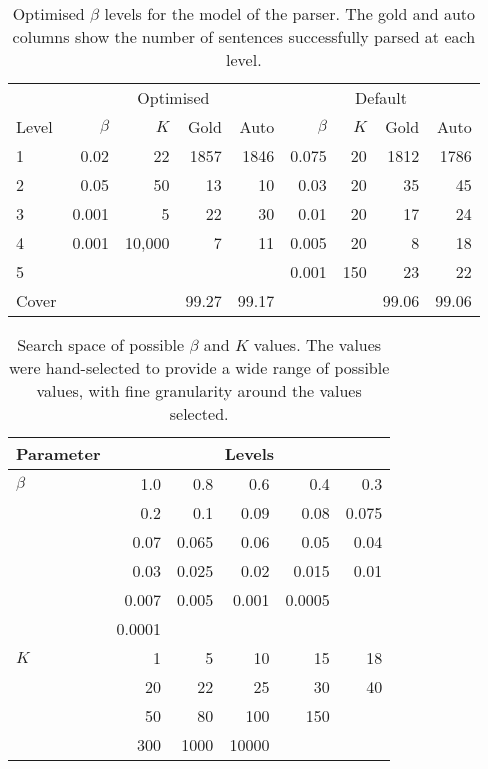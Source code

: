\begin{table}
\centering
\begin{tabular}{l|rrrr|rrrr}
\hline
      & \multicolumn{4}{c|}{Optimised}& \multicolumn{4}{c}{Default} \\
Level & $\beta$ & $K$ & Gold & Auto   & $\beta$ & $K$  & Gold & Auto \\
\hline
\hline
1     & 0.02    & 22      & 1857 & 1846   & 0.075    & 20  & 1812 & 1786 \\
2     & 0.05    & 50      & 13   & 10     & 0.03     & 20  & 35   & 45   \\
3     & 0.001   & 5       & 22   & 30     & 0.01     & 20  & 17    & 24   \\
4     & 0.001   & 10,000  & 7    & 11     & 0.005    & 20  & 8    & 18    \\
5     &         &         &      &        & 0.001    & 150 & 23   & 22   \\
\hline
Cover &         &         &99.27 & 99.17  &          &     &99.06 & 99.06\\
\hline
\end{tabular}
 \caption[Optimised $\beta$ levels for \ccgbank parser.]{Optimised $\beta$
levels for the \hybrid model of the \ccgbank parser. The gold and auto columns
show the number of sentences successfully parsed at each
level.\label{tab:ccgbank_betas}}
\end{table}

\begin{table}
\centering
\begin{tabular}{l|rrrrr}
\hline\hline
Parameter & \multicolumn{5}{c}{Levels}\\
\hline
$\beta$ & 1.0 & 0.8 & 0.6 & 0.4 &0.3 \\
        &0.2  & 0.1 &0.09 &0.08 &0.075 \\
        &0.07 &0.065&0.06 &0.05 &0.04 \\
        &0.03 &0.025&0.02 &0.015&0.01\\
        &0.007&0.005&0.001&0.0005&\\
        &0.0001     &     &      \\
\hline
$K$     &1    &5    &10   &15   &18\\
        &20   &22   &25   &30   &40\\
        &50   &80   &100  &150  &  \\
        &300  &1000 &10000&     &  \\
\hline
 \end{tabular}
\caption[$\beta$ and $K$ value search space.]{Search space of possible $\beta$
and $K$ values. The values were hand-selected to provide a wide range of
possible values, with fine granularity around the values \citet{clark:cl07}
selected.\label{tab:beta_k_search}}
\end{table}


